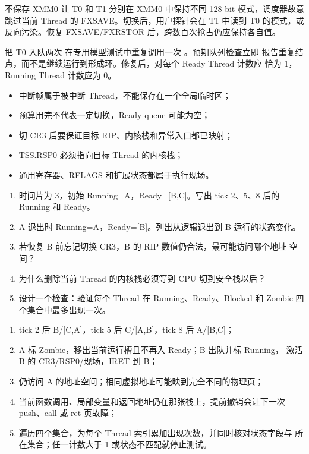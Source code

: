 \begin{faultinjectionbox}{不保存 XMM0}
让 T0 和 T1 分别在 XMM0 中保持不同 128-bit 模式，调度器故意跳过当前 Thread
的 FXSAVE。切换后，用户探针会在 T1 中读到 T0 的模式，或反向污染。恢复
FXSAVE/FXRSTOR 后，跨数百次抢占仍应保持各自值。
\end{faultinjectionbox}

\begin{faultinjectionbox}{把 T0 入队两次}
在专用模型测试中重复调用一次 。预期队列检查立即
报告重复结点，而不是继续运行到形成环。修复后，对每个 Ready Thread 计数应
恰为 1，Running Thread 计数应为 0。
\end{faultinjectionbox}

\begin{pitfallbox}
\begin{itemize}[leftmargin=2.2em]
  \item 中断帧属于被中断 Thread，不能保存在一个全局临时区；
  \item 预算用完不代表一定切换，Ready queue 可能为空；
  \item 切 CR3 后要保证目标 RIP、内核栈和异常入口都已映射；
  \item TSS.RSP0 必须指向目标 Thread 的内核栈；
  \item 通用寄存器、RFLAGS 和扩展状态都属于执行现场。
\end{itemize}
\end{pitfallbox}


\begin{enumerate}[leftmargin=2.2em]
  \item 时间片为 3，初始 Running=A，Ready=[B,C]。写出 tick 2、5、8 后的
    Running 和 Ready。
  \item A 退出时 Running=A，Ready=[B]。列出从逻辑退出到 B 运行的状态变化。
  \item 若恢复 B 前忘记切换 CR3，B 的 RIP 数值仍合法，最可能访问哪个地址
    空间？
  \item 为什么删除当前 Thread 的内核栈必须等到 CPU 切到安全栈以后？
  \item 设计一个检查：验证每个 Thread 在 Running、Ready、Blocked 和 Zombie
    四个集合中最多出现一次。
\end{enumerate}

\begin{answerbox}
\begin{enumerate}[leftmargin=2.2em]
  \item tick 2 后 B/[C,A]，tick 5 后 C/[A,B]，tick 8 后 A/[B,C]；
  \item A 标 Zombie，移出当前运行槽且不再入 Ready；B 出队并标 Running，
    激活 B 的 CR3/RSP0/现场，IRET 到 B；
  \item 仍访问 A 的地址空间；相同虚拟地址可能映到完全不同的物理页；
  \item 当前函数调用、局部变量和返回地址仍在那张栈上，提前撤销会让下一次
    push、call 或 ret 页故障；
  \item 遍历四个集合，为每个 Thread 索引累加出现次数，并同时核对状态字段与
    所在集合；任一计数大于 1 或状态不匹配就停止测试。
\end{enumerate}
\end{answerbox}
